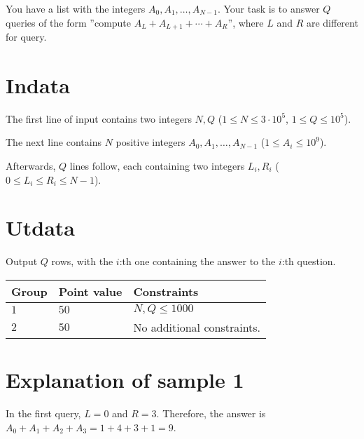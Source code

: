 You have a list with the integers $A_0, A_1, \dots, A_{N-1}$.
Your task is to answer $Q$ queries of the form ”compute $A_L+A_{L+1}+\cdots+A_{R}$”, where $L$ and $R$
are different for query.

\section*{Indata}
The first line of input contains two integers $N, Q$ ($1 \leq N \leq 3 \cdot 10^5$, $1 \leq Q \leq 10^5$).

The next line contains $N$ positive integers $A_0, A_1, \dots, A_{N-1}$ ($1 \leq A_i \leq 10^9$).

Afterwards, $Q$ lines follow, each containing two integers $L_{i},R_{i}$ ($0 \leq L_{i} \leq R_{i} \leq N-1$).

\section*{Utdata}
Output $Q$ rows, with the $i$:th one containing the answer to the $i$:th question.

\noindent
\begin{tabular}{| l | l | p{12cm} |}
  \hline
  \textbf{Group} & \textbf{Point value} & \textbf{Constraints} \\ \hline
  $1$    & $50$      &  $N,Q \leq 1000$ \\ \hline
  $2$    & $50$      & No additional constraints. \\ \hline
\end{tabular}

\section*{Explanation of sample 1}
In the first query, $L=0$ and $R=3$. Therefore, the answer is $A_0+A_1+A_2+A_3=1+4+3+1=9$.
